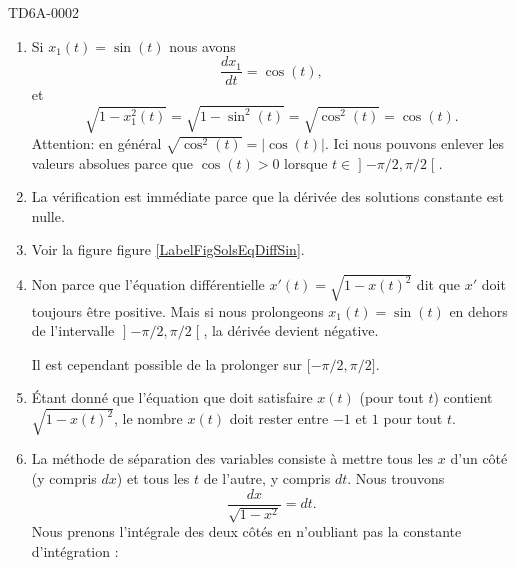 \begin{corrige}{TD6A-0002}

    \begin{enumerate}
        \item
            Si \( x_1(t)=\sin(t)\) nous avons
            \begin{equation}
                \frac{ dx_1 }{ dt }=\cos(t),
            \end{equation}
            et 
            \begin{equation}
                \sqrt{1-x_1^2(t)}=\sqrt{1-\sin^2(t)}=\sqrt{\cos^2(t)}=\cos(t).
            \end{equation}
            Attention: en général \( \sqrt{\cos^2(t)}=| \cos(t) |\). Ici nous pouvons enlever les valeurs absolues parce que \( \cos(t)>0\) lorsque \( t\in\mathopen] -\pi/2 , \pi/2 \mathclose[\).

        \item

            La vérification est immédiate parce que la dérivée des solutions constante est nulle.

        \item

            Voir la figure figure \ref{LabelFigSolsEqDiffSin}.
            \newcommand{\CaptionFigSolsEqDiffSin}{Trois de solutions à l'équation différentielle de l'exercice \ref{exoTD6A-0002}.}
            

        \item
            
            Non parce que l'équation différentielle \( x'(t)=\sqrt{1-x(t)^2}\) dit que \( x'\) doit toujours être positive. Mais si nous prolongeons \( x_1(t)=\sin(t)\) en dehors de l'intervalle \( \mathopen] -\pi/2 , \pi/2 \mathclose[\), la dérivée devient négative.

            Il est cependant possible de la prolonger sur \( \mathopen[ -\pi/2 , \pi/2 \mathclose]\).

        \item

            Étant donné que l'équation que doit satisfaire \( x(t)\) (pour tout \( t\)) contient \( \sqrt{1-x(t)^2}\), le nombre \( x(t)\) doit rester entre \( -1\) et \( 1\) pour tout \( t\).

        \item

            La méthode de séparation des variables consiste à mettre tous les \( x\) d'un côté (y compris \( dx\)) et tous les \( t\) de l'autre, y compris \( dt\). Nous trouvons
            \begin{equation}
                \frac{ dx }{ \sqrt{1-x^2} }=dt.
            \end{equation}
            Nous prenons l'intégrale des deux côtés en n'oubliant pas la constante d'intégration :


\end{enumerate}
\end{corrige}
